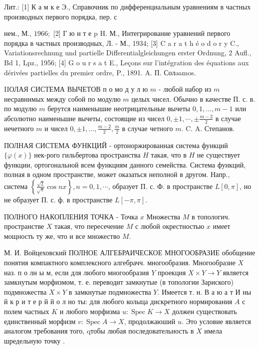 \documentclass[10pt]{article}
\begin{document}
Лит.: [1] К а м к е Э., Справочник по дифференциальным уравнениям в частных производных первого порядка, пер. с

нем., М., $1966 ;$ [2] Г ю н т е p H. М., Интегрирование уравнений первого порядка в частных производных, Л. - М., 1934; [3] C a r a t h é o d o r y C., Variationsrechnung und partielle Differentialgleichungen erster Ordnung, 2 Aufl., Bd 1, Lpz., 1956; [4] G o u r s a t E., Leçons sur l'intégration des équations aux dérivées partielles du premier ordre, P., 1891. A. П. Солəamos.



IIОЛАЯ СИСТЕМА ВЫЧЕТОВ п о мо д у л ю $m$ - любой набор из $m$ несравнимых между собой по модулю $m$ целых чисел. Обычно в качестве П. с. в. по модулю $m$ берутся наименышие неотрицательные вычеты $0,1, \ldots, m-1$ или абсолютно наименьшие вычеты, состоящие из чисел $0, \pm 1, \cdots, \pm \frac{m-2}{2}$ в случае нечетного $m$ и чисел $0, \pm 1, \ldots, \frac{m-2}{2}, \frac{m}{2}$ в случае четного $m$. C. A. Степанов.



ПОЛНАЯ СИСТЕМА ФУНКЦИЙ - ортоноржированная система функций $\{\varphi(x)\}$ нек-рого гильбертова пространства $H$ такая, что в $H$ не существует функции, ортогональной всем функциям данного семейства. Система функций, полная в одном пространстве, может оказаться неполной в другом. Напр., система $\left\{\frac{\sqrt{2}}{\sqrt{\pi}} \cos n x\right\}, n=0,1, \cdots$, образует П. с. Ф. в пространстве $L[0, \pi]$, но не образует П. с. ф. в пространстве $L[-\pi, \pi]$.



ПОЛНОГО НАКОПЛЕНИЯ ТОЧКА - Точка $x$ Множества $M$ в топологич. пространстве $X$ такая, что пересечение $M$ с любой окрестностью $x$ имеет мощность ту же, что и все множество $M$.



М. И. Войцеховский ПОЛНОЕ АЛГЕБРАИЧЕСКОЕ МНОГООБРАЗИЕ обобщение понятия компактного комплексного алгебрачч. многообразия. Многообразие $X$ наз. п о лн ы м, если для любого многообразия $Y$ проекция $X \times Y \rightarrow Y$ является замкнутым морфизмом, т. е. переводит замкнутые (в топологии Зариского) подмножества $X \times Y$ в замкнутые подмножества $Y$. Имеется т. н. В а ю а т И ны й к р и т е р й й о л но ты: для любого колыца дискретного нормирования $A$ с полем частных $K$ и любого морфизма $u: \operatorname{Spec} K \rightarrow X$ должен существовать единственный морфизм $v: \operatorname{Spec} A \rightarrow X$, продолжаюший $u$. Это условие является аналогом требования того, qтобы любая последовательность в $X$ имела шредельную точку .
\end{document}
